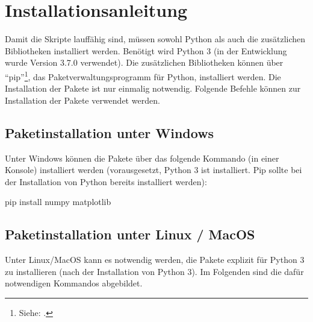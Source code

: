 \section{Installationsanleitung}
Damit die Skripte lauffähig sind, müssen sowohl Python als auch die zusätzlichen Bibliotheken installiert werden.
Benötigt wird Python 3 (in der Entwicklung wurde Version 3.7.0 verwendet).
Die zusätzlichen Bibliotheken können über \enquote{pip}\footnote{ Siehe: \cite{Foundation2019}.}, das Paketverwaltungsprogramm für Python, installiert werden.
Die Installation der Pakete ist nur einmalig notwendig.
Folgende Befehle können zur Installation der Pakete verwendet werden.

\subsection{Paketinstallation unter Windows}
Unter Windows können die Pakete über das folgende Kommando (in einer Konsole) installiert werden (vorausgesetzt, Python 3 ist installiert. Pip sollte bei der Installation von Python bereits installiert werden):
{}{}

\begin{PipCommandWindows}
pip install numpy matplotlib
\end{PipCommandWindows}

\subsection{Paketinstallation unter Linux / MacOS}

Unter Linux/MacOS kann es notwendig werden, die Pakete explizit für Python 3 zu installieren (nach der Installation von Python 3). Im Folgenden sind die dafür notwendigen Kommandos abgebildet.
{}{}

